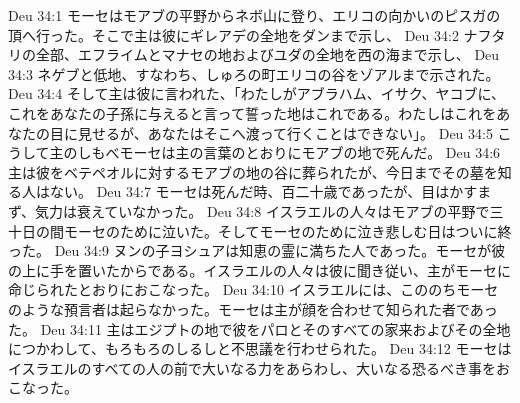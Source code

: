 Deu 34:1  モーセはモアブの平野からネボ山に登り、エリコの向かいのピスガの頂へ行った。そこで主は彼にギレアデの全地をダンまで示し、
Deu 34:2  ナフタリの全部、エフライムとマナセの地およびユダの全地を西の海まで示し、
Deu 34:3  ネゲブと低地、すなわち、しゅろの町エリコの谷をゾアルまで示された。
Deu 34:4  そして主は彼に言われた、「わたしがアブラハム、イサク、ヤコブに、これをあなたの子孫に与えると言って誓った地はこれである。わたしはこれをあなたの目に見せるが、あなたはそこへ渡って行くことはできない」。
Deu 34:5  こうして主のしもべモーセは主の言葉のとおりにモアブの地で死んだ。
Deu 34:6  主は彼をベテペオルに対するモアブの地の谷に葬られたが、今日までその墓を知る人はない。
Deu 34:7  モーセは死んだ時、百二十歳であったが、目はかすまず、気力は衰えていなかった。
Deu 34:8  イスラエルの人々はモアブの平野で三十日の間モーセのために泣いた。そしてモーセのために泣き悲しむ日はついに終った。
Deu 34:9  ヌンの子ヨシュアは知恵の霊に満ちた人であった。モーセが彼の上に手を置いたからである。イスラエルの人々は彼に聞き従い、主がモーセに命じられたとおりにおこなった。
Deu 34:10  イスラエルには、こののちモーセのような預言者は起らなかった。モーセは主が顔を合わせて知られた者であった。
Deu 34:11  主はエジプトの地で彼をパロとそのすべての家来およびその全地につかわして、もろもろのしるしと不思議を行わせられた。
Deu 34:12  モーセはイスラエルのすべての人の前で大いなる力をあらわし、大いなる恐るべき事をおこなった。


